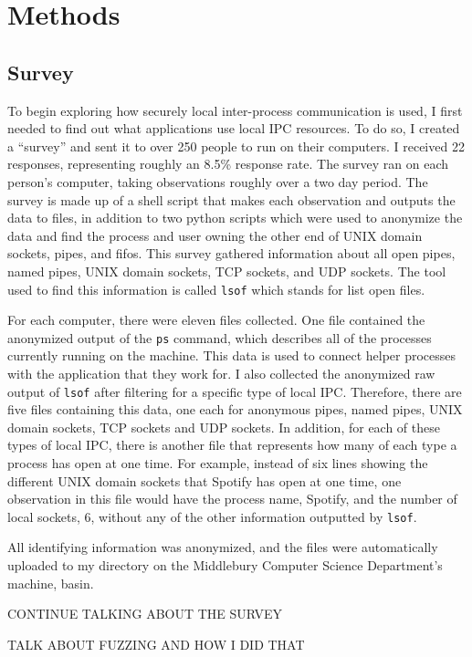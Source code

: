 \chapter{Methods}
\label{sec:methods}

\section{Survey}
\label{sec:survey}
To begin exploring how securely local inter-process communication is used, I first needed to find out what applications use local IPC resources.  To do so, I created a ``survey'' and sent it to over 250 people to run on their computers.  I received 22 responses, representing roughly an 8.5\% response rate.  The survey ran on each person's computer, taking observations roughly over a two day period.  The survey is made up of a shell script that makes each observation and outputs the data to files, in addition to two python scripts which were used to anonymize the data and find the process and user owning the other end of UNIX domain sockets, pipes, and fifos.  This survey gathered information about all open pipes, named pipes, UNIX domain sockets, TCP sockets, and UDP sockets.  The tool used to find this information is called \texttt{lsof} which stands for list open files.

For each computer, there were eleven files collected.  One file contained the anonymized output of the \texttt{ps} command, which describes all of the processes currently running on the machine.  This data is used to connect helper processes with the application that they work for.  I also collected the anonymized raw output of \texttt{lsof} after filtering for a specific type of local IPC.  Therefore, there are five files containing this data, one each for anonymous pipes, named pipes, UNIX domain sockets, TCP sockets and UDP sockets.  In addition, for each of these types of local IPC, there is another file that represents how many of each type a process has open at one time.  For example, instead of six lines showing the different UNIX domain sockets that Spotify has open at one time, one observation in this file would have the process name, Spotify, and the number of local sockets, 6, without any of the other information outputted by \texttt{lsof}.

All identifying information was anonymized, and the files were automatically uploaded to my directory on the Middlebury Computer Science Department's machine, basin.  


CONTINUE TALKING ABOUT THE SURVEY

TALK ABOUT FUZZING AND HOW I DID THAT